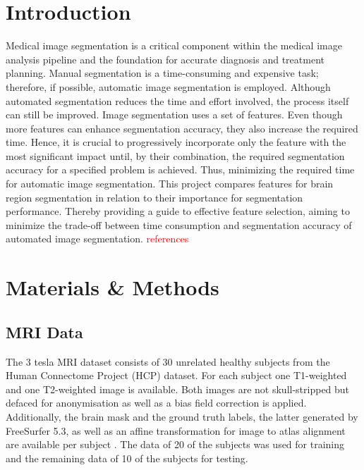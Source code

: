 \documentclass[conference]{IEEEtran}
\begin{document}


\section{Introduction} \label{sec:Introduction}
Medical image segmentation is a critical component within the medical image analysis pipeline and the foundation for accurate diagnosis and treatment planning. Manual segmentation is a time-consuming and expensive task; therefore, if possible, automatic image segmentation is employed. Although automated segmentation reduces the time and effort involved, the process itself can still be improved. Image segmentation uses a set of features. Even though more features can enhance segmentation accuracy, they also increase the required time. Hence, it is crucial to progressively incorporate only the feature with the most significant impact until, by their combination, the required segmentation accuracy for a specified problem is achieved. Thus, minimizing the required time for automatic image segmentation. This project compares features for brain region segmentation in relation to their importance for segmentation performance. Thereby providing a guide to effective feature selection, aiming to minimize the trade-off between time consumption and segmentation accuracy of automated image segmentation.
\textcolor{red}{references}


\section{Materials \& Methods} \label{sec:Materials \& Methods}
\subsection{MRI Data} \label{subsec:MRI Data}
 The 3 tesla MRI dataset consists of 30 unrelated healthy subjects from the Human Connectome Project (HCP) dataset. For each subject one T1-weighted and one T2-weighted image is available. Both images are not skull-stripped but defaced for anonymisation as well as a bias field correction is applied. Additionally, the brain mask and the ground truth labels, the latter generated by FreeSurfer 5.3, as well as an affine transformation for image to atlas alignment are available per subject \cite{b2}. The data of 20 of the subjects was used for training and the remaining data of 10 of the subjects for testing.
\end{document}
